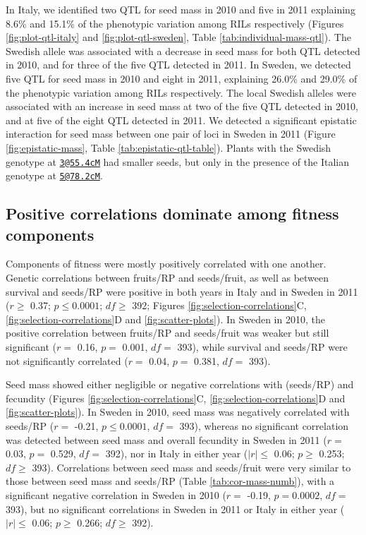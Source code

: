 \documentclass[
]{article}
\begin{document}
In Italy, we identified two QTL for seed mass in 2010 and five in 2011 explaining 8.6\% and 15.1\% of the phenotypic variation among RILs respectively (Figures \ref{fig:plot-qtl-italy} and \ref{fig:plot-qtl-sweden}, Table \ref{tab:individual-mass-qtl}). The Swedish allele was associated with a decrease in seed mass for both QTL detected in 2010, and for three of the five QTL detected in 2011. In Sweden, we detected five QTL for seed mass in 2010 and eight in 2011, explaining 26.0\% and 29.0\% of the phenotypic variation among RILs respectively. The local Swedish alleles were associated with an increase in seed mass at two of the five QTL detected in 2010, and at five of the eight QTL detected in 2011. We detected a significant epistatic interaction for seed mass between one pair of loci in Sweden in 2011 (Figure \ref{fig:epistatic-mass}, Table \ref{tab:epistatic-qtl-table}). Plants with the Swedish genotype at \href{mailto:3@55.4cM}{\nolinkurl{3@55.4cM}} had smaller seeds, but only in the presence of the Italian genotype at \href{mailto:5@78.2cM}{\nolinkurl{5@78.2cM}}.

\hypertarget{positive-correlations-dominate-among-fitness-components}{%
\subsection{Positive correlations dominate among fitness components}\label{positive-correlations-dominate-among-fitness-components}}

Components of fitness were mostly positively correlated with one another. Genetic correlations between fruits/RP and seeds/fruit, as well as between survival and seeds/RP were positive in both years in Italy and in Sweden in 2011
(\(r \geq\)
0.37;
\(p \leq 0.0001\);
\(df \geq\)
392;
Figures \ref{fig:selection-correlations}C, \ref{fig:selection-correlations}D and \ref{fig:scatter-plots}).
In Sweden in 2010, the positive correlation between fruits/RP and seeds/fruit was weaker but still significant
(\(r=\) 0.16,
\(p=\) 0.001,
\(df=\) 393),
while survival and seeds/RP were not significantly correlated
(\(r=\) 0.04,
\(p=\) 0.381,
\(df=\) 393).

Seed mass showed either negligible or negative correlations with (seeds/RP) and fecundity (Figures \ref{fig:selection-correlations}C, \ref{fig:selection-correlations}D and \ref{fig:scatter-plots}).
In Sweden in 2010, seed mass was negatively correlated with seeds/RP
(\(r=\) -0.21,
\(p \leq 0.0001\),
\(df=\) 393),
whereas no significant correlation was detected between seed mass and overall fecundity in Sweden in 2011
(\(r=\) 0.03,
\(p=\) 0.529,
\(df=\) 392),
nor in Italy in either year
(\(|r| \leq\) 0.06;
\(p \geq\) 0.253;
\(df \geq\)
393).
Correlations between seed mass and seeds/fruit were very similar to those between seed mass and seeds/RP (Table \ref{tab:cor-mass-numb}), with a significant negative correlation in Sweden in 2010
(\(r=\) -0.19,
\(p = 0.0002\),
\(df=\) 393),
but no significant correlations in Sweden in 2011 or Italy in either year
(\(|r| \leq\) 0.06;
\(p \geq\) 0.266;
\(df \geq\)
392).
\end{document}
